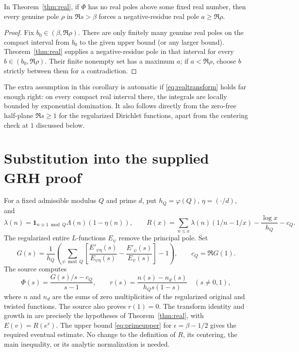 \documentclass[11pt,letterpaper]{article}
\theoremstyle{remark}\newtheorem{remark}[theorem]{Remark}
\newcommand{\decl}[1]{\texttt{\detokenize{#1}}}
\begin{document}
\begin{corollary}\label{cor:right}
In Theorem~\ref{thm:real}, if $\Phi$ has no real poles above some fixed real number, then every genuine pole $\rho$ in $\Re s>\beta$ forces a negative-residue real pole $a\ge\Re\rho$.
\end{corollary}
\begin{proof}
Fix $b_0\in(\beta,\Re\rho)$. There are only finitely many genuine real poles on the compact interval from $b_0$ to the given upper bound (or any larger bound). Theorem~\ref{thm:real} supplies a negative-residue pole in that interval for every $b\in(b_0,\Re\rho)$. Their finite nonempty set has a maximum $a$; if $a<\Re\rho$, choose $b$ strictly between them for a contradiction.
\end{proof}
The extra assumption in this corollary is automatic if \eqref{eq:realtransform} holds far enough right: on every compact real interval there, the integrals are locally bounded by exponential domination. It also follows directly from the zero-free half-plane $\Re s\ge1$ for the regularized Dirichlet functions, apart from the centering check at $1$ discussed below.

\section{Substitution into the supplied GRH proof}\label{sec:dirichlet}
For a fixed admissible modulus $Q$ and prime $d$, put $h_Q=\varphi(Q)$, $\eta=(\cdot/d)$, and
\[
 \lambda(n)=\mathbf 1_{n\equiv1\bmod Q}\Lambda(n)(1-\eta(n)),\qquad
 R(x)=\sum_{n\le x}\lambda(n)(1/n-1/x)-\frac{\log x}{h_Q}-c_Q.
\]
The regularized entire $L$-functions $E_\psi$ remove the principal pole. Set
\[
 G(s)=\frac{1}{h_Q}\left(\sum_{\psi\bmod Q}\left[\frac{E'_{\psi\eta}(s)}{E_{\psi\eta}(s)}-
 \frac{E'_\psi(s)}{E_\psi(s)}\right]-1\right),\qquad c_Q=\Re G(1).
\]
The source computes
\begin{equation}\label{eq:Phi}
 \Phi(s)=\frac{G(s)/s-c_Q}{s-1},\qquad
 r(s)=\frac{n(s)-n_d(s)}{h_Q s(1-s)}\quad(s\ne0,1),
\end{equation}
where $n$ and $n_d$ are the sums of zero multiplicities of the regularized original and twisted functions. The source also proves $r(1)=0$. The transform identity and growth in \decl{IsPolar} are precisely the hypotheses of Theorem~\ref{thm:real}, with $E(v)=R(e^v)$. The upper bound \eqref{eq:primeupper} for $\epsilon=\beta-1/2$ gives the required eventual estimate. No change to the definition of $R$, its centering, the main inequality, or its analytic normalization is needed.
\end{document}
